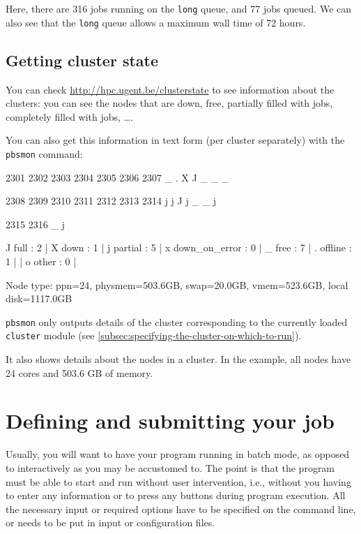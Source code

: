 Here, there are 316 jobs running on the \lstinline|long| queue, and 77 jobs queued. We
can also see that the \lstinline|long| queue allows a maximum wall time of 72 hours.

\ifgent
\subsection{Getting cluster state}

You can check \url{http://hpc.ugent.be/clusterstate} to see information about
the clusters: you can see the nodes that are down, free, partially filled with jobs,
completely filled with jobs, \ldots.

You can also get this information in text form (per cluster separately) with
the \lstinline|pbsmon| command:


\begin{prompt}
2301 2302 2303 2304 2305 2306 2307
    _    .    X    J    _    _    _

 2308 2309 2310 2311 2312 2313 2314
    j    j    J    j    _    _    j

 2315 2316
    _    j

   J full                 : 2   |   X down                 : 1   |
   j partial              : 5   |   x down_on_error        : 0   |
   _ free                 : 7   |   . offline              : 1   |
                                |   o other                : 0   |

Node type:
 ppn=24, physmem=503.6GB, swap=20.0GB, vmem=523.6GB, local disk=1117.0GB
\end{prompt}

\lstinline|pbsmon| only outputs details of the cluster corresponding to the
currently loaded \lstinline|cluster| module (see \autoref{subsec:specifying-the-cluster-on-which-to-run}).

It also shows details about the nodes in a cluster. In the example, all nodes have
24 cores and 503.6 GB of memory.

\fi

\section{Defining and submitting your job}
\hypertarget{sec:defining-and-submitting-job}{}

Usually, you will want to have your program running in batch mode, as opposed
to interactively as you may be accustomed to. The point is that the program
must be able to start and run without user intervention, i.e., without you
having to enter any information or to press any buttons during program
execution. All the necessary input or required options have to be specified on
the command line, or needs to be put in input or configuration files.

